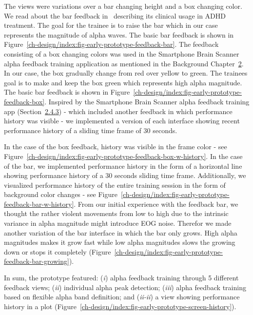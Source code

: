 \documentclass[a4paper,10pt,english,lof,lot,twoside]{puthesis}
\begin{document}
The views were variations over a bar changing height and a box changing
color. We read about the bar feedback in \cite{larsen_classification_2011} describing its clinical usage in ADHD
treatment. The goal for the trainee is to raise the bar which in our case
represents the magnitude of alpha waves. The basic bar feedback is shown in
Figure \ref{ch-design/index:fig-early-prototype-feedback-bar}. The feedback consisting
of a box changing colors was used in the Smartphone Brain Scanner alpha feedback
training application as mentioned in the Background Chapter {\hyperref[ch-background/index:ch-background]{2}}. In our case, the
box gradually change from red over yellow to green. The trainees goal is to make
and keep the box green which represents high alpha magnitude. The basic bar
feedback is shown in Figure \ref{ch-design/index:fig-early-prototype-feedback-box}. Inspired by the Smartphone Brain
Scanner alpha feedback training app (Section {\hyperref[ch-background/index:ch-background-smartphone-brain-scanner-2]{2.4.3}}) - which included another
feedback in which performance history was visible - we implemented a version of
each interface showing recent performance history of a sliding time frame of 30
seconds.

In the case of the box feedback, history was visible in the frame color - see
Figure \ref{ch-design/index:fig-early-prototype-feedback-box-w-history}. In the case of
the bar, we implemented performance history in the form of a horizontal line
showing performance history of a 30 seconds sliding time frame. Additionally, we
visualized performance history of the entire training session in the form of
background color changes - see Figure \ref{ch-design/index:fig-early-prototype-feedback-bar-w-history}. From our initial experience
with the feedback bar, we thought the rather violent movements from low to high
due to the intrinsic variance in alpha magnitude might introduce EOG
noise. Therefor we made another variation of the bar interface in which the bar
only grows. High alpha magnitudes makes it grow fast while low alpha magnitudes
slows the growing down or stops it completely (Figure \ref{ch-design/index:fig-early-prototype-feedback-bar-growing}).

In sum, the prototype featured: (\emph{i}) alpha feedback training through 5
different feedback views; (\emph{ii}) individual alpha peak detection; (\emph{iii}) alpha
feedback training based on flexible alpha band definition; and (\emph{ii-ii}) a view
showing performance history in a plot (Figure \ref{ch-design/index:fig-early-prototype-screen-history}).
\end{document}
